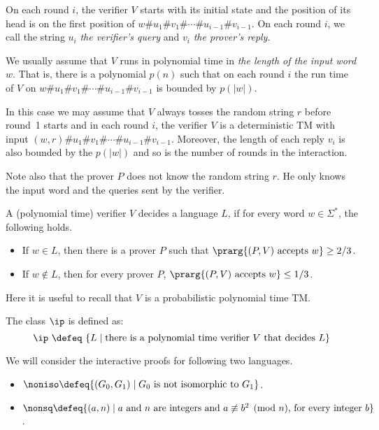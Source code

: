 \documentclass[11pt, a4paper]{article}
\begin{document}
On each round $i$, the verifier $V$ starts with its initial state
and the position of its head is on the first position of $w\# u_1 \# v_1 \#\cdots  \#  u_{i-1}\# v_{i-1}$.
On each round $i$, we call the string $u_i$ {\em the verifier's query} 
and $v_i$ {\em the prover's reply}.

\begin{remark}
We usually assume that $V$ runs in polynomial time in {\em the length of the input word $w$}.
That is, there is a polynomial $p(n)$ such that on each round $i$
the run time of $V$ on $w\# u_1 \# v_1 \#\cdots  \#  u_{i-1}\# v_{i-1}$
is bounded by $p(|w|)$.

In this case we may assume that $V$ always tosses the random string $r$ before round~1 starts
and in each round $i$, the verifier $V$ is a deterministic TM with input 
$(w,r)\# u_1 \# v_1 \#\cdots  \#  u_{i-1}\# v_{i-1}$.
Moreover, the length of each reply $v_i$ is also bounded by the $p(|w|)$
and so is the number of rounds in the interaction.  

Note also that the prover $P$ does not know the random string $r$.
He only knows the input word and the queries sent by the verifier. 
\end{remark}

\begin{definition}
\label{def:verifier-decide}
A (polynomial time) verifier $V$ decides a language $L$,
if for every word $w\in \Sigma^*$, the following holds.
\begin{itemize}
\item
If $w\in L$, then there is a prover $P$ such that $\prarg {(P,V)\ \text{accepts}\ w} \geq 2/3$.
\item
If $w\notin L$, then for every prover $P$, $\prarg {(P,V)\ \text{accepts}\ w} \leq 1/3$.
\end{itemize}
Here it is useful to recall that $V$ is a probabilistic polynomial time TM.
\end{definition}

The class $\ip$ is defined as:
$$
\ip \ \defeq \ \{L \mid \text{there is a polynomial time verifier}\ V \ \text{that decides}\ L\}
$$




\begin{example}
We will consider the interactive proofs for following two languages.
\begin{itemize}
\item
$\noniso \defeq \{ (G_0,G_1) \mid \text{$G_0$ is not isomorphic to $G_1$}\}$.
\item
$\nonsq \defeq \{ (a,n) \mid \text{$a$ and $n$ are integers and $a \not\equiv b^2 \pmod n$, for every integer $b$}\}$.
\end{itemize}
\end{example}
\end{document}

